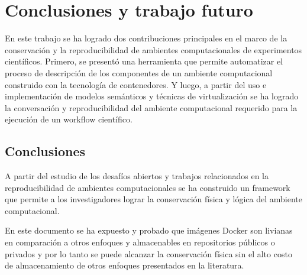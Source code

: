 
\chapter{Conclusiones y trabajo futuro} %


%
%

En este trabajo se ha logrado dos contribuciones principales en el marco de la conservación y la reproducibilidad de ambientes computacionales de experimentos científicos. 
Primero, se presentó una herramienta que permite automatizar el proceso de descripción de los componentes de un ambiente computacional construido con la tecnología de contenedores.
Y luego, a partir del uso e implementación de modelos semánticos y 
técnicas de virtualización se ha logrado la conversación y reproducibilidad del ambiente computacional requerido para la ejecución de un workflow 
científico.

\section{Conclusiones}

A partir del estudio de los desafíos abiertos y trabajos 
relacionados en la reproducibilidad de ambientes computacionales se ha construido un framework que permite a los investigadores lograr la conservación física y lógica del ambiente computacional.

En este documento se ha expuesto y probado que imágenes Docker son 
livianas en comparación a otros enfoques y almacenables en repositorios públicos o privados y por lo tanto se puede alcanzar la conservación física sin el alto costo de almacenamiento de otros enfoques presentados en la literatura.

